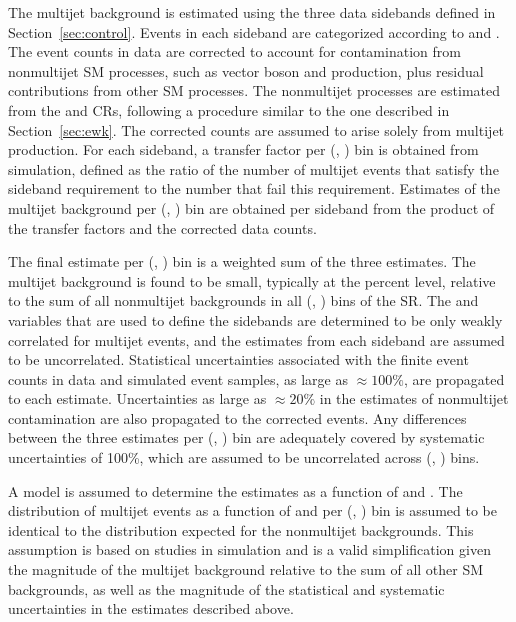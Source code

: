 The multijet background is estimated using the three data sidebands
defined in Section~\ref{sec:control}. Events in each sideband are
categorized according to \njet and \scalht. The event counts in data
are corrected to account for contamination from nonmultijet SM
processes, such as vector boson and \ttbar production, plus residual
contributions from other SM processes. The nonmultijet processes are
estimated from the \mj and \mmj CRs, following a procedure similar to
the one described in Section~\ref{sec:ewk}. The corrected counts are
assumed to arise solely from multijet production. For each sideband, a
transfer factor per (\njet, \scalht) bin is obtained from simulation,
defined as the ratio of the number of multijet events that satisfy the
sideband requirement to the number that fail this
requirement. Estimates of the multijet background per (\njet, \scalht)
bin are obtained per sideband from the product of the transfer factors
and the corrected data counts.

The final estimate per (\njet, \scalht) bin is a weighted sum of the
three estimates. The multijet background is found to be small,
typically at the percent level, relative to the sum of all nonmultijet
backgrounds in all (\njet, \nb) bins of the SR. The \mhtmet and \bdphi
variables that are used to define the sidebands are determined to be
only weakly correlated for multijet events, and the estimates from
each sideband are assumed to be uncorrelated. Statistical
uncertainties associated with the finite event counts in data and
simulated event samples, as large as ${\approx}100\%$, are propagated
to each estimate. Uncertainties as large as ${\approx}20\%$ in the
estimates of nonmultijet contamination are also propagated to the
corrected events. Any differences between the three estimates per
(\njet, \scalht) bin are adequately covered by systematic
uncertainties of 100\%, which are assumed to be uncorrelated across
(\njet, \scalht) bins.

A model is assumed to determine the estimates as a function of \nb and
\mht. The distribution of multijet events as a function of \nb and
\mht per (\njet, \scalht) bin is assumed to be identical to the
distribution expected for the nonmultijet backgrounds. This assumption
is based on studies in simulation and is a valid simplification given
the magnitude of the multijet background relative to the sum of all
other SM backgrounds, as well as the magnitude of the statistical and
systematic uncertainties in the estimates described above.


